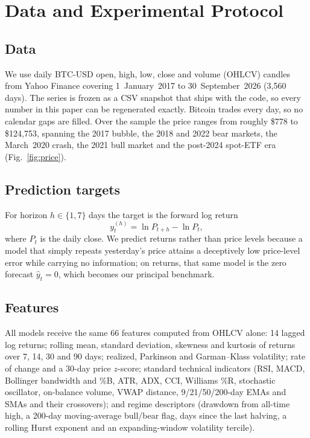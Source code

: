 \section{Data and Experimental Protocol}
\label{sec:method}

\subsection{Data}
We use daily BTC-USD open, high, low, close and volume (OHLCV) candles from Yahoo Finance covering 1~January~2017 to 30~September~2026 (3{,}560 days). The series is frozen as a CSV snapshot that ships with the code, so every number in this paper can be regenerated exactly. Bitcoin trades every day, so no calendar gaps are filled. Over the sample the price ranges from roughly \$778 to \$124{,}753, spanning the 2017 bubble, the 2018 and 2022 bear markets, the March~2020 crash, the 2021 bull market and the post-2024 spot-ETF era (Fig.~\ref{fig:price}).

\subsection{Prediction targets}
For horizon $h \in \{1, 7\}$ days the target is the forward log return
\begin{equation}
  y_t^{(h)} = \ln P_{t+h} - \ln P_t ,
\end{equation}
where $P_t$ is the daily close. We predict returns rather than price levels because a model that simply repeats yesterday's price attains a deceptively low price-level error while carrying no information; on returns, that same model is the zero forecast $\hat y_t = 0$, which becomes our principal benchmark.

\subsection{Features}
All models receive the same 66 features computed from OHLCV alone: 14 lagged log returns; rolling mean, standard deviation, skewness and kurtosis of returns over 7, 14, 30 and 90 days; realized, Parkinson and Garman--Klass volatility; rate of change and a 30-day price $z$-score; standard technical indicators (RSI, MACD, Bollinger bandwidth and \%B, ATR, ADX, CCI, Williams \%R, stochastic oscillator, on-balance volume, VWAP distance, 9/21/50/200-day EMAs and SMAs and their crossovers); and regime descriptors (drawdown from all-time high, a 200-day moving-average bull/bear flag, days since the last halving, a rolling Hurst exponent and an expanding-window volatility tercile).


